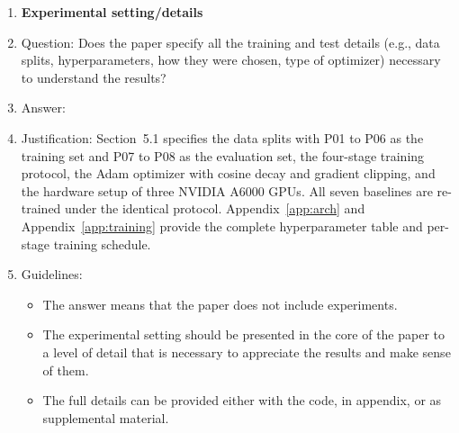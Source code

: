 \begin{enumerate}
\item {\bf Experimental setting/details}
    \item[] Question: Does the paper specify all the training and test details (e.g., data splits, hyperparameters, how they were chosen, type of optimizer) necessary to understand the results?
    \item[] Answer: \answerYes{}
    \item[] Justification: Section~5.1 specifies the data splits with P01 to P06 as the training set and P07 to P08 as the evaluation set, the four-stage training protocol, the Adam optimizer with cosine decay and gradient clipping, and the hardware setup of three NVIDIA A6000 GPUs. All seven baselines are re-trained under the identical protocol. Appendix~\ref{app:arch} and Appendix~\ref{app:training} provide the complete hyperparameter table and per-stage training schedule.
    \item[] Guidelines:
    \begin{itemize}
        \item The answer \answerNA{} means that the paper does not include experiments.
        \item The experimental setting should be presented in the core of the paper to a level of detail that is necessary to appreciate the results and make sense of them.
        \item The full details can be provided either with the code, in appendix, or as supplemental material.
    \end{itemize}


\end{enumerate}
